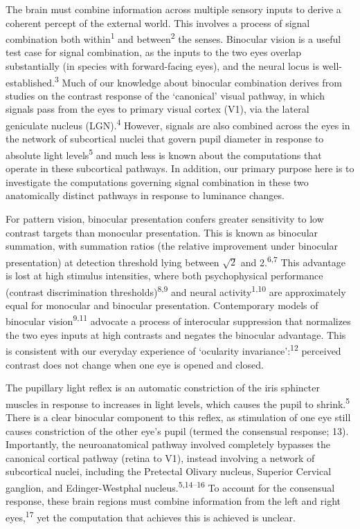 \documentclass[
]{article}
\begin{document}
The brain must combine information across multiple sensory inputs to derive a coherent percept of the external world. This involves a process of signal combination both within\textsuperscript{1} and between\textsuperscript{2} the senses. Binocular vision is a useful test case for signal combination, as the inputs to the two eyes overlap substantially (in species with forward-facing eyes), and the neural locus is well-established.\textsuperscript{3} Much of our knowledge about binocular combination derives from studies on the contrast response of the `canonical' visual pathway, in which signals pass from the eyes to primary visual cortex (V1), via the lateral geniculate nucleus (LGN).\textsuperscript{4} However, signals are also combined across the eyes in the network of subcortical nuclei that govern pupil diameter in response to absolute light levels\textsuperscript{5} and much less is known about the computations that operate in these subcortical pathways. In addition, our primary purpose here is to investigate the computations governing signal combination in these two anatomically distinct pathways in response to luminance changes.

For pattern vision, binocular presentation confers greater sensitivity to low contrast targets than monocular presentation. This is known as binocular summation, with summation ratios (the relative improvement under binocular presentation) at detection threshold lying between \(\sqrt{2}\) and 2.\textsuperscript{6,7} This advantage is lost at high stimulus intensities, where both psychophysical performance (contrast discrimination thresholds)\textsuperscript{8,9} and neural activity\textsuperscript{1,10} are approximately equal for monocular and binocular presentation. Contemporary models of binocular vision\textsuperscript{9,11} advocate a process of interocular suppression that normalizes the two eyes inputs at high contrasts and negates the binocular advantage. This is consistent with our everyday experience of `ocularity invariance':\textsuperscript{12} perceived contrast does not change when one eye is opened and closed.

The pupillary light reflex is an automatic constriction of the iris sphincter muscles in response to increases in light levels, which causes the pupil to shrink.\textsuperscript{5} There is a clear binocular component to this reflex, as stimulation of one eye still causes constriction of the other eye's pupil (termed the consensual response; 13). Importantly, the neuroanatomical pathway involved completely bypasses the canonical cortical pathway (retina to V1), instead involving a network of subcortical nuclei, including the Pretectal Olivary nucleus, Superior Cervical ganglion, and Edinger-Westphal nucleus.\textsuperscript{5,14--16} To account for the consensual response, these brain regions must combine information from the left and right eyes,\textsuperscript{17} yet the computation that achieves this is achieved is unclear.
\end{document}
